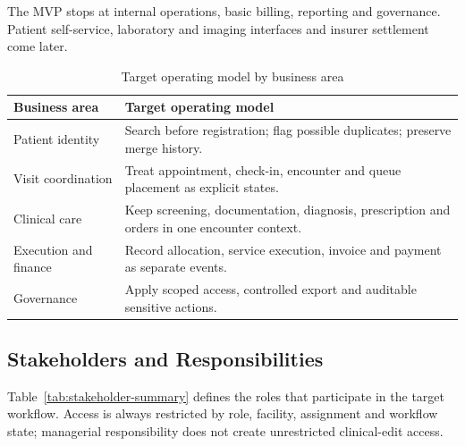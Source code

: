 \documentclass[a4paper,12pt]{article}
\begin{document}
The MVP stops at internal operations, basic billing, reporting and governance. Patient self-service, laboratory and imaging interfaces and insurer settlement come later.

\begin{table}[H]
\centering
\small
\renewcommand{\arraystretch}{1.12}
\begin{tabularx}{\textwidth}{@{}P{0.23\textwidth}Y@{}}
\toprule
Business area & Target operating model \\
\midrule
Patient identity & Search before registration; flag possible duplicates; preserve merge history. \\
Visit coordination & Treat appointment, check-in, encounter and queue placement as explicit states. \\
Clinical care & Keep screening, documentation, diagnosis, prescription and orders in one encounter context. \\
Execution and finance & Record allocation, service execution, invoice and payment as separate events. \\
Governance & Apply scoped access, controlled export and auditable sensitive actions. \\
\bottomrule
\end{tabularx}
\caption{Target operating model by business area}
\label{tab:business-as-is-to-be}
\end{table}

\subsection{Stakeholders and Responsibilities}
Table~\ref{tab:stakeholder-summary} defines the roles that participate in the target workflow. Access is always restricted by role, facility, assignment and workflow state; managerial responsibility does not create unrestricted clinical-edit access.
\end{document}
